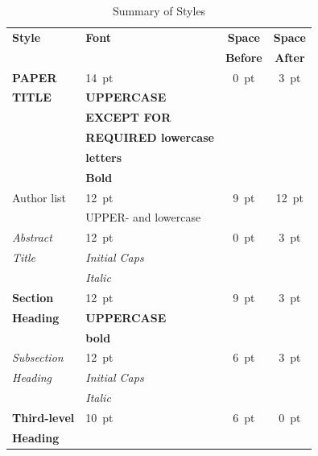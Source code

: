 \documentclass[letterpaper,
               nospread,     %
               ]{jacow}
\begin{document}
  \begin{table}[h!b]
	\setlength\tabcolsep{3.5pt}
	\centering
	\caption{Summary of Styles}
	\label{tab:styles}
	\begin{tabular}{llcc}
		\toprule
		\textbf{Style} & \textbf{Font}               & \textbf{Space}  & \textbf{Space} \\
		&                             & \textbf{Before} & \textbf{After} \\
		\midrule
		\textbf{PAPER}  & \SI{14}{pt}                 & \SI{0}{pt}      & \SI{3}{pt}  \\
		\textbf{TITLE}  & \textbf{UPPERCASE}          &                 &      \\
		& \textbf{EXCEPT FOR}         &                 &      \\
		& \textbf{REQUIRED lowercase} &                 &      \\
		& \textbf{letters}            &                 &      \\
		& \textbf{Bold}               &                 &      \\[5pt]
		Author list  & \SI{12}{pt}                 & \SI{9}{pt}      & \SI{12}{pt} \\
		& UPPER- and lowercase        &                 &      \\[5pt]
		\textit{Abstract} & \SI{12}{pt}                 & \SI{0}{pt}      & \SI{3}{pt} \\
		\textit{Title}  & \textit{Initial Caps}       &                 &      \\
		& \textit{Italic}             &                 &      \\[5pt]
		\textbf{Section}  & \SI{12}{pt}                 & \SI{9}{pt}      & \SI{3}{pt}  \\
		\textbf{Heading}  & \textbf{UPPERCASE}          &                 &      \\
		& \textbf{bold}               &                 &      \\[5pt]
		\textit{Subsection} & \SI{12}{pt}                 & \SI{6}{pt}      & \SI{3}{pt}  \\
		\textit{Heading}
                             & \textit{Initial Caps}       &                 &      \\
		& \textit{Italic}             &                 &      \\[5pt]
		\textbf{Third-level} & \SI{10}{pt}                 & \SI{6}{pt}      & \SI{0}{pt}  \\
		\textbf{Heading}     

\end{tabular}
\end{table}
\end{document}

